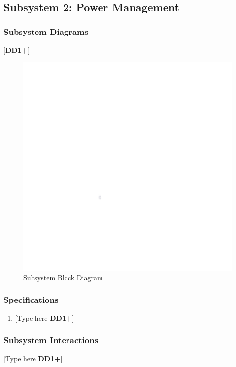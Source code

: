 \clearpage
\subsection{Subsystem 2: Power Management}

\subsubsection{Subsystem Diagrams}
[\textbf{DD1+}]
\begin{figure}[h]
    \centering
    \includegraphics[width=16cm]{images/white.png} %
    \caption{Subsystem Block Diagram}
\end{figure} %

\subsubsection{Specifications}
\begin{enumerate}
    \item {[Type here \textbf{DD1+}]}
\end{enumerate}

\subsubsection{Subsystem Interactions}
[Type here \textbf{DD1+}]

